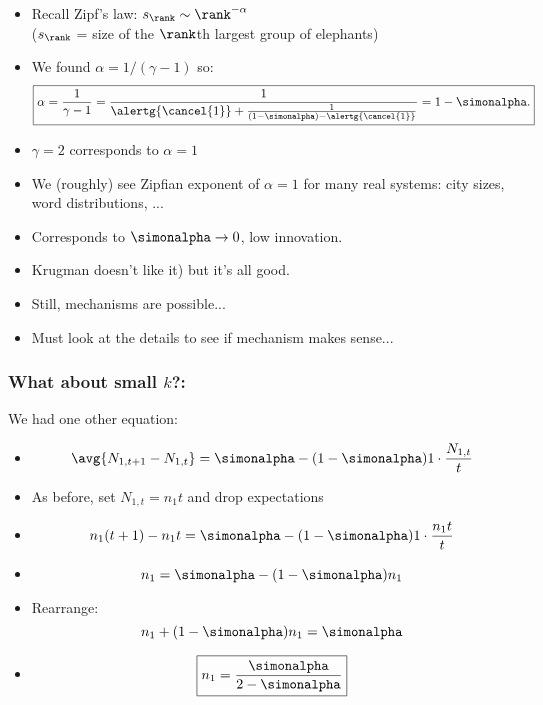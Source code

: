\begin{frame}

  \begin{block}{}
  \begin{itemize}
  \item<+-> 
    Recall Zipf's law: $s_\rank \sim \rank^{-\alpha}$\\
    ($s_\rank$ = size of the $\rank$th largest group of elephants)
  \item<+-> 
    We found $\alpha = 1/(\gamma-1)$ so:
    $$
    \boxed{
      \alpha 
      = 
      \frac{1}{\gamma-1}
      = 
      \frac{1}
      {\alertg{\cancel{1}} + \frac{1}{(1-\simonalpha) - \alertg{\cancel{1}}}}
      =
      1 - \simonalpha.
    }
    $$
  \item<+-> 
    $\gamma = 2$ corresponds to $\alpha = 1$
  \item<+-> 
    We (roughly) see Zipfian exponent\cite{zipf1949a} 
    of $\alpha=1$ for many real systems:
    city sizes, word distributions, ...
  \item<+-> 
    Corresponds to $\simonalpha \rightarrow 0$, low innovation.
  \item<+-> 
    Krugman doesn't like it)\cite{krugman1995a}
    but it's all good.
  \item<+-> 
    Still,  mechanisms are possible...
  \item<+-> 
    Must look at the details to see if mechanism makes sense...  
  \end{itemize}
  \end{block}

\end{frame}

\begin{frame}
  \frametitle{What about small $k$?:}

  \begin{block}{We had one other equation:}
    \begin{itemize}
  \item <1->
    $$
    \avg{N_{1,t+1} - N_{1,t}}
    =
    \simonalpha
    -(1-\simonalpha)
    1\cdot\frac{N_{1,t}}{t}
    $$
  \item <2->
    As before, set $N_{1,t} = n_1 t$ and drop expectations
  \item <3->
    $$
    n_1(t+1) - n_1 t 
    =
    \simonalpha
    -(1-\simonalpha)
    1\cdot\frac{n_{1}t}{t}
    $$
  \item <3->
    $$
    n_1
    =
    \simonalpha
    -(1-\simonalpha) n_1
    $$
  \item <4->
    Rearrange:
    $$
    n_1 + ( 1-\simonalpha) n_1 
    = \simonalpha
    $$
  \item <5->
    $$
    \boxed{
      n_1 
      = \frac{\simonalpha}{2-\simonalpha}
    }
    $$
  \end{itemize}
  \end{block}

\end{frame}



